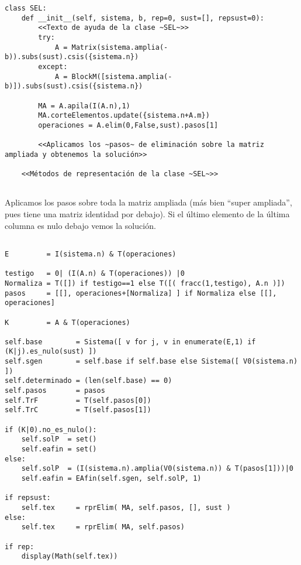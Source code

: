 \documentclass[11pt]{report}
\begin{document}
\begin{verbatim}
class SEL:
    def __init__(self, sistema, b, rep=0, sust=[], repsust=0):
        <<Texto de ayuda de la clase ~SEL~>>
        try:
            A = Matrix(sistema.amplia(-b)).subs(sust).csis({sistema.n})
        except:
            A = BlockM([sistema.amplia(-b)]).subs(sust).csis({sistema.n})
            
        MA = A.apila(I(A.n),1)
        MA.corteElementos.update({sistema.n+A.m})
        operaciones = A.elim(0,False,sust).pasos[1]
        
        <<Aplicamos los ~pasos~ de eliminación sobre la matriz ampliada y obtenemos la solución>>
        
    <<Métodos de representación de la clase ~SEL~>>
    
\end{verbatim}

Aplicamos los pasos sobre toda la matriz ampliada (más bien ``super
ampliada'', pues tiene una matriz identidad por debajo). Si el último
elemento de la última columna es nulo debajo vemos la solución.

\begin{verbatim}

E         = I(sistema.n) & T(operaciones)

testigo   = 0| (I(A.n) & T(operaciones)) |0
Normaliza = T([]) if testigo==1 else T([( fracc(1,testigo), A.n )])
pasos     = [[], operaciones+[Normaliza] ] if Normaliza else [[], operaciones]

K         = A & T(operaciones)

self.base        = Sistema([ v for j, v in enumerate(E,1) if (K|j).es_nulo(sust) ])
self.sgen        = self.base if self.base else Sistema([ V0(sistema.n) ])
self.determinado = (len(self.base) == 0)
self.pasos       = pasos 
self.TrF         = T(self.pasos[0]) 
self.TrC         = T(self.pasos[1])

if (K|0).no_es_nulo():
    self.solP  = set()
    self.eafin = set()
else:
    self.solP  = (I(sistema.n).amplia(V0(sistema.n)) & T(pasos[1]))|0 
    self.eafin = EAfin(self.sgen, self.solP, 1)

if repsust:
    self.tex     = rprElim( MA, self.pasos, [], sust )
else:
    self.tex     = rprElim( MA, self.pasos)

if rep:
    display(Math(self.tex))           

\end{verbatim}
\end{document}

